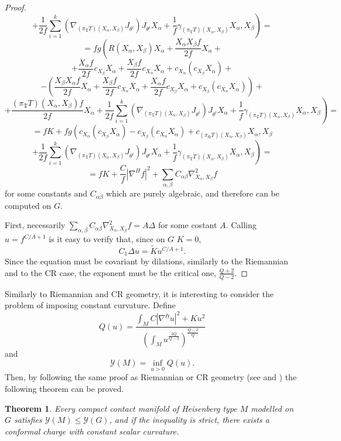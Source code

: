 \documentclass{article}
\newcommand{\ci}[1]{\mathscr{#1}}%
\newcommand{\g}[1]{\mathfrak{#1}}
\newcommand{\alfa}{\alpha}
\newtheorem{teorema}[proposizione]{Theorem}
\theoremstyle{definition}
\theoremstyle{remark}
\begin{document}
\begin{proof}
 $$\left.+\frac{1}{2f}\sum_{i=1}^k(\nabla_{(\pi_{\g{T}}T)(X_{\alfa},X_{\beta})}J_{\theta^i})J_{\theta^i}X_{\alfa} +  \frac{1}{f}\gamma_{(\pi_{\g{T}}T)(X_{\alfa},X_{\beta})}X_{\alfa}, X_{\beta}\right)=$$
 $$= fg\left(R(X_{\alfa},X_{\beta})X_{\alfa}  + \frac{X_{\alfa}X_{\beta}f}{2f}X_{\alfa} +\right.$$
 $$ + \frac{X_{\alfa}f}{2f}c_{X_{\beta}}X_{\alfa} + \frac{X_{\beta}f}{2f}c_{X_{\alfa}}X_{\alfa} + c_{X_{\alfa}}(c_{X_{\beta}}X_{\alfa}) +$$
 $$-\left( \frac{X_{\beta}X_{\alfa}f}{2f}X_{\alfa} + \frac{X_{\beta}f}{2f}c_{X_{\alfa}}X_{\alfa} + \frac{X_{\alfa}f}{2f}c_{X_{\beta}}X_{\alfa} + c_{X_{\beta}}(c_{X_{\alfa}}X_{\alfa})\right) +$$
 $$\left. + \frac{(\pi_{\g{T}}T)(X_{\alfa},X_{\beta})f}{2f}X_{\alfa} + \frac{1}{2f}\sum_{i=1}^k(\nabla_{(\pi_{\g{T}}T)(X_{\alfa},X_{\beta})}J_{\theta^i})J_{\theta^i}X_{\alfa} +  \frac{1}{f}\gamma_{(\pi_{\g{T}}T)(X_{\alfa},X_{\beta})}X_{\alfa}, X_{\beta}\right)=$$
 $$= fK+ fg\left(c_{X_{\alfa}}(c_{X_{\beta}}X_{\alfa}) -c_{X_{\beta}}(c_{X_{\alfa}}X_{\alfa}) +c_{(\pi_{\g{H}}T)(X_{\alfa},X_{\beta})}X_{\alfa}, X_{\beta}\right.$$
 $$\left.+\frac{1}{2f}\sum_{i=1}^k(\nabla_{(\pi_{\g{T}}T)(X_{\alfa},X_{\beta})}J_{\theta^i})J_{\theta^i}X_{\alfa} +  \frac{1}{f}\gamma_{(\pi_{\g{T}}T)(X_{\alfa},X_{\beta})}X_{\alfa}, X_{\beta}\right)=$$
 $$= fK+ \frac{C}{f}|\nabla^Hf|^2 + \sum_{\alfa,\beta}C_{\alfa\beta}\nabla^2_{X_{\alfa},X_{\beta}}f$$
 for some constants and $C_{\alfa\beta}$ which are purely algebraic, and therefore can be computed on $G$.
 
 First, necessarily $\sum_{\alfa,\beta}C_{\alfa\beta}\nabla^2_{X_{\alfa},X_{\beta}}f = A\Delta$ for some costant $A$.
 Calling $u=f^{C/A+1}$ is it easy to verify that, since on $G$ $K=0$,
 $$C_1\Delta u = \widetilde{K}u^{C/A+1}.$$
 Since the equation must be covariant by dilations, similarly to the Riemannian and to the CR case, the exponent must be the critical one, $\frac{Q+2}{Q-2}$.
\end{proof}

Similarly to Riemannian and CR geometry, it is interesting to consider the problem of imposing constant curvature.
Define
$$Q(u) = \frac{\int_M C|\nabla^{\g{H}}u|^2 + Ku^2}{\left(\int_M u^{\frac{2Q}{Q-2}}\right)^{\frac{Q-2}{Q}}}$$
and
$$\ci{Y}(M) = \inf_{u>0}Q(u).$$
Then, by following the same proof as Riemannian or CR geometry (see \cite{LP} and \cite{JL1}) the following theorem can be proved.

\begin{teorema}
 Every compact contact manifold of Heisenberg type $M$ modelled on $G$ satisfies $\ci{Y}(M)\le\ci{Y}(G)$, and if the inequality is strict, there exists a conformal charge with constant scalar curvature.
\end{teorema}
\end{document}
